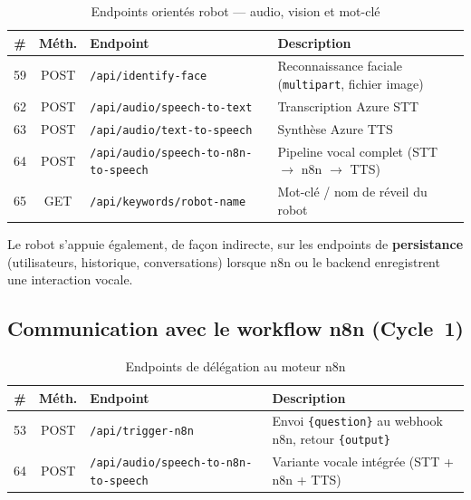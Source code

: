 \documentclass[a4paper,12pt]{report}
\begin{document}
	\begin{table}[htbp]
		\centering
		\caption{Endpoints orientés robot --- audio, vision et mot-clé}
		\label{tab:ch4-endpoints-robot}
		\small
		\renewcommand{\arraystretch}{1.2}
		\begin{tabularx}{\textwidth}{|c|c|>{\raggedright\arraybackslash}p{5.5cm}|>{\raggedright\arraybackslash}X|}
			\hline
			\textbf{\#} & \textbf{Méth.} & \textbf{Endpoint} & \textbf{Description} \\
			\hline
			59 & POST & \texttt{/api/identify-face} & Reconnaissance faciale (\texttt{multipart}, fichier image) \\
			62 & POST & \texttt{/api/audio/speech-to-text} & Transcription Azure STT \\
			63 & POST & \texttt{/api/audio/text-to-speech} & Synthèse Azure TTS \\
			64 & POST & \texttt{/api/audio/speech-to-n8n-to-speech} & Pipeline vocal complet (STT $\rightarrow$ n8n $\rightarrow$ TTS) \\
			65 & GET & \texttt{/api/keywords/robot-name} & Mot-clé / nom de réveil du robot \\
			\hline
		\end{tabularx}
	\end{table}
	
	Le robot s'appuie également, de façon indirecte, sur les endpoints de
	\textbf{persistance} (utilisateurs, historique, conversations) lorsque n8n ou le
	backend enregistrent une interaction vocale.
	
	\subsection{Communication avec le workflow n8n (Cycle~1)}
	
	\begin{table}[htbp]
		\centering
		\caption{Endpoints de délégation au moteur n8n}
		\label{tab:ch4-endpoints-n8n}
		\small
		\renewcommand{\arraystretch}{1.2}
		\begin{tabularx}{\textwidth}{|c|c|>{\raggedright\arraybackslash}p{5.8cm}|>{\raggedright\arraybackslash}X|}
			\hline
			\textbf{\#} & \textbf{Méth.} & \textbf{Endpoint} & \textbf{Description} \\
			\hline
			53 & POST & \texttt{/api/trigger-n8n} & Envoi \texttt{\{question\}} au webhook n8n, retour \texttt{\{output\}} \\
			64 & POST & \texttt{/api/audio/speech-to-n8n-to-speech} & Variante vocale intégrée (STT + n8n + TTS) \\
			\hline
		\end{tabularx}
	\end{table}
	
\end{document}
